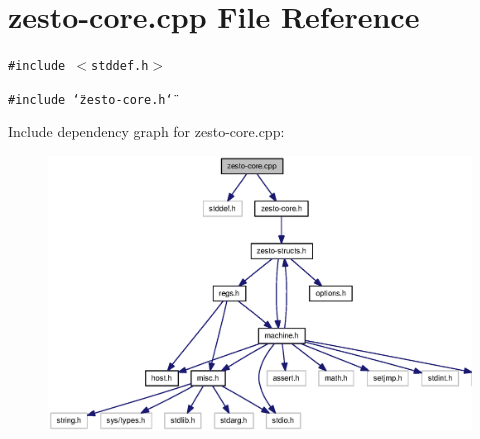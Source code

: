 \section{zesto-core.cpp File Reference}
\label{zesto-core_8cpp}
{\tt \#include $<$stddef.h$>$}\par
{\tt \#include \char`\"{}zesto-core.h\char`\"{}}\par


Include dependency graph for zesto-core.cpp:\nopagebreak
\begin{figure}[H]
\begin{center}
\leavevmode
\includegraphics[width=333pt]{zesto-core_8cpp__incl}
\end{center}
\end{figure}
